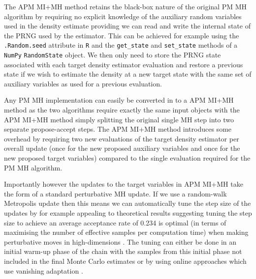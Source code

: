 The \ac{APM} \ac{MI}+\ac{MH} method retains the black-box nature of the original \ac{PM} \ac{MH} algorithm by requiring no explicit knowledge of the auxiliary random variables used in the density estimate providing we can read and write the internal state of the \ac{PRNG} used by the estimator. This can be achieved for example using the \texttt{.Random.seed} attribute in \texttt{R} and the \texttt{get\_state} and \texttt{set\_state} methods of a \texttt{NumPy} \texttt{RandomState} object. We then only need to store the \ac{PRNG} state associated with each target density estimator evaluation and restore a previous state if we wish to estimate the density at a new target state with the same set of auxiliary variables as used for a previous evaluation.

Any \ac{PM} \ac{MH} implementation can easily be converted in to a \ac{APM} \ac{MI}+\ac{MH} method as the two algorithms require exactly the same input objects with the \ac{APM} \ac{MI}+\ac{MH} method simply splitting the original single \ac{MH} step into two separate propose-accept steps. The \ac{APM} \ac{MI}+\ac{MH} method introduces some overhead by requiring two new evaluations of the target density estimator per overall update (once for the new proposed auxiliary variables and once for the new proposed target variables) compared to the single evaluation required for the \ac{PM} \ac{MH} algorithm. 

Importantly however the updates to the target variables in \ac{APM} \ac{MI}+\ac{MH} take the form of a standard perturbative \ac{MH} update. If we use a random-walk Metropolis update then this means we can automatically tune the step size of the updates by for example appealing to theoretical results suggesting tuning the step size to achieve an average acceptance rate of 0.234 is optimal (in terms of maximising the number of effective samples per computation time) when making perturbative moves in high-dimensions \citep{gelman1997weak}. The tuning can either be done in an initial warm-up phase of the chain with the samples from this initial phase not included in the final Monte Carlo estimates or by using online approaches which use vanishing adaptation \citep{andrieu2008tutorial,graves2011automatic}. %

